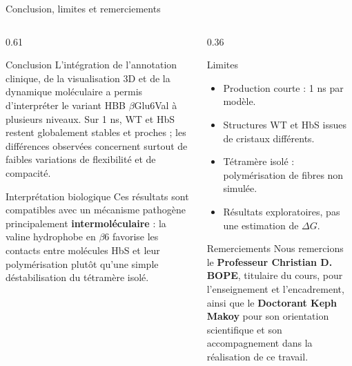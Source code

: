 \documentclass[aspectratio=169,10pt]{beamer}
\newcommand{\important}[1]{\textcolor{DeepRed}{\textbf{#1}}}
\begin{document}
\begin{frame}{Conclusion, limites et remerciements}
\begin{columns}[T,totalwidth=\textwidth]
\begin{column}{0.61\textwidth}
\begin{block}{Conclusion}
\footnotesize
L'intégration de l'annotation clinique, de la visualisation 3D et de la dynamique moléculaire a permis d'interpréter le variant HBB \(\beta\)Glu6Val à plusieurs niveaux. Sur 1 ns, WT et HbS restent globalement stables et proches ; les différences observées concernent surtout de faibles variations de flexibilité et de compacité.
\end{block}
\begin{block}{Interprétation biologique}
\footnotesize
Ces résultats sont compatibles avec un mécanisme pathogène principalement \important{intermoléculaire} : la valine hydrophobe en \(\beta\)6 favorise les contacts entre molécules HbS et leur polymérisation plutôt qu'une simple déstabilisation du tétramère isolé.
\end{block}
\end{column}
\begin{column}{0.36\textwidth}
\begin{block}{Limites}
\scriptsize
\begin{itemize}
  \item Production courte : 1 ns par modèle.
  \item Structures WT et HbS issues de cristaux différents.
  \item Tétramère isolé : polymérisation de fibres non simulée.
  \item Résultats exploratoires, pas une estimation de \(\Delta G\).
\end{itemize}
\end{block}
\begin{block}{Remerciements}
\scriptsize
Nous remercions le \textbf{Professeur Christian D. BOPE}, titulaire du cours, pour l'enseignement et l'encadrement, ainsi que le \textbf{Doctorant Keph Makoy} pour son orientation scientifique et son accompagnement dans la réalisation de ce travail.
\end{block}
\end{column}
\end{columns}
\end{frame}
\end{document}
